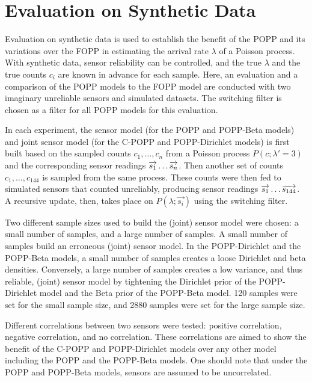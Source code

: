 \section{Evaluation on Synthetic Data}
\label{sec:evasim}

Evaluation on synthetic data is used to establish the benefit of the POPP and its variations over the FOPP in estimating the arrival rate $\lambda$ of a Poisson process. With synthetic data, sensor reliability can be controlled, and the true $\lambda$ and the true counts $c_i$ are known in advance for each sample. Here, an evaluation and a comparison of the POPP models to the FOPP model are conducted with two imaginary unreliable sensors and simulated datasets. The switching filter is chosen as a filter for all POPP models for this evaluation.

In each experiment, the sensor model (for the POPP and POPP-Beta models) and joint sensor model (for the C-POPP and POPP-Dirichlet models) is first built based on the sampled counts $c_1, \ldots, c_n$ from a Poisson process $P(c ; \lambda'=3)$ and the corresponding sensor readings $\protect\overrightarrow{s_1} \ldots \protect\overrightarrow{s_{n}}$. Then another set of counts $c_1, \ldots, c_{144}$ is sampled from the same process. These counts were then fed to simulated sensors that counted unreliably, producing sensor readings $\protect\overrightarrow{s_1} \ldots \protect\overrightarrow{s_{144}}$. A recursive update, then, takes place on $P(\lambda ; \overrightarrow{s_i})$ using the switching filter.

Two different sample sizes used to build the (joint) sensor model were chosen: a small number of samples, and a large number of samples. A small number of samples build an erroneous (joint) sensor model. In the POPP-Dirichlet and the POPP-Beta models, a small number of samples creates a loose Dirichlet and beta densities. Conversely, a large number of samples creates a low variance, and thus reliable, (joint) sensor model by tightening the Dirichlet prior of the POPP-Dirichlet model and the Beta prior of the POPP-Beta model. 120 samples were set for the small sample size, and 2880 samples were set for the large sample size.

Different correlations between two sensors were tested: positive correlation, negative correlation, and no correlation. These correlations are aimed to show the benefit of the C-POPP and POPP-Dirichlet models over any other model including the POPP and the POPP-Beta models. One should note that under the POPP and POPP-Beta models, sensors are assumed to be uncorrelated.  

